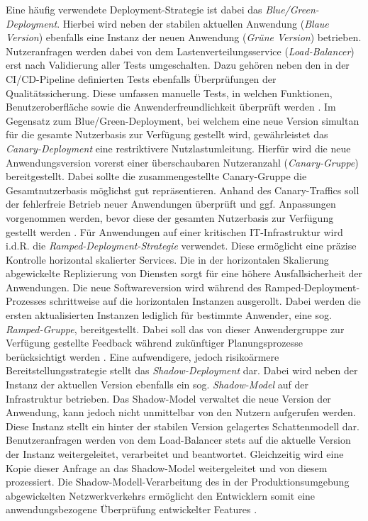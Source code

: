 Eine häufig verwendete Deployment-Strategie ist dabei das \textit{Blue/Green-Deployment}. Hierbei wird neben der stabilen aktuellen Anwendung (\textit{Blaue Version}) ebenfalls eine Instanz der neuen Anwendung (\textit{Grüne Version}) betrieben. Nutzeranfragen werden dabei von dem Lastenverteilungsservice (\textit{Load-Balancer}) erst nach Validierung aller Tests umgeschalten. Dazu gehören neben den in der CI/CD-Pipeline definierten Tests ebenfalls Überprüfungen der Qualitätssicherung. Diese umfassen manuelle Tests, in welchen Funktionen, Benutzeroberfläche sowie die Anwenderfreundlichkeit überprüft werden \cite{Ugochi.20220503}. Im Gegensatz zum Blue/Green-Deployment, bei welchem eine neue Version simultan für die gesamte Nutzerbasis zur Verfügung gestellt wird, gewährleistet das \textit{Canary-Deployment} eine restriktivere Nutzlastumleitung. Hierfür wird die neue Anwendungsversion vorerst einer überschaubaren Nutzeranzahl (\textit{Canary-Gruppe}) bereitgestellt. Dabei sollte die zusammengestellte Canary-Gruppe die Gesamtnutzerbasis möglichst gut repräsentieren. Anhand des Canary-Traffics soll der fehlerfreie Betrieb neuer Anwendungen überprüft und ggf. Anpassungen vorgenommen werden, bevor diese der gesamten Nutzerbasis zur Verfügung gestellt werden \cite{Ugochi.20220503}. Für Anwendungen auf einer kritischen IT-Infrastruktur wird i.d.R. die \textit{Ramped-Deployment-Strategie} verwendet. Diese ermöglicht eine präzise Kontrolle horizontal skalierter Services. Die in der horizontalen Skalierung abgewickelte Replizierung von Diensten sorgt für eine höhere Ausfallsicherheit der Anwendungen. Die neue Softwareversion wird während des Ramped-Deployment-Prozesses schrittweise auf die horizontalen Instanzen ausgerollt. Dabei werden die ersten aktualisierten Instanzen lediglich für bestimmte Anwender, eine sog. \textit{Ramped-Gruppe}, bereitgestellt. Dabei soll das von dieser Anwendergruppe zur Verfügung gestellte Feedback während zukünftiger Planungsprozesse berücksichtigt werden \cite{Ugochi.20220503}. Eine aufwendigere, jedoch risikoärmere Bereitstellungsstrategie stellt das \textit{Shadow-Deployment} dar. Dabei wird neben der Instanz der aktuellen Version ebenfalls ein sog. \textit{Shadow-Model} auf der Infrastruktur betrieben. Das Shadow-Model verwaltet die neue Version der Anwendung, kann jedoch nicht unmittelbar von den Nutzern aufgerufen werden. Diese Instanz stellt ein hinter der stabilen Version gelagertes Schattenmodell dar. Benutzeranfragen werden von dem Load-Balancer stets auf die aktuelle Version der Instanz weitergeleitet, verarbeitet und beantwortet. Gleichzeitig wird eine Kopie dieser Anfrage an das Shadow-Model weitergeleitet und von diesem prozessiert. Die Shadow-Modell-Verarbeitung des in der Produktionsumgebung abgewickelten Netzwerkverkehrs ermöglicht den Entwicklern somit eine anwendungsbezogene Überprüfung entwickelter Features \cite{Ugochi.20220503}. 